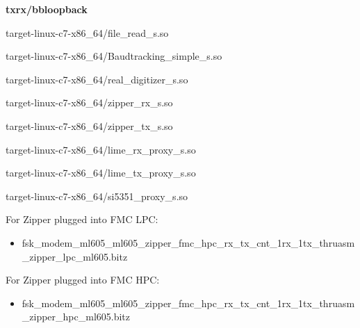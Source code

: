	\noindent\textbf{txrx/bbloopback}
	\begin{itemize}
	\begin{minipage}[t]{.5\textwidth}
	\item target-linux-c7-x86\_64/file\_read\_s.so
	\item target-linux-c7-x86\_64/Baudtracking\_simple\_s.so
	\item target-linux-c7-x86\_64/real\_digitizer\_s.so
	\item target-linux-c7-x86\_64/zipper\_rx\_s.so
	\end{minipage}
	\begin{minipage}[t]{.5\textwidth}
	\item target-linux-c7-x86\_64/zipper\_tx\_s.so
	\item target-linux-c7-x86\_64/lime\_rx\_proxy\_s.so
	\item target-linux-c7-x86\_64/lime\_tx\_proxy\_s.so
	\item target-linux-c7-x86\_64/si5351\_proxy\_s.so
	\end{minipage}
	\end{itemize}
	For Zipper plugged into FMC LPC:
	\begin{itemize}
		\item fsk\_modem\_ml605\_ml605\_zipper\_fmc\_hpc\_rx\_tx\_cnt\_1rx\_1tx\_thruasm\_zipper\_lpc\_ml605.bitz
	\end{itemize}
	\noindent For Zipper plugged into FMC HPC:
	\begin{itemize}
		\item fsk\_modem\_ml605\_ml605\_zipper\_fmc\_hpc\_rx\_tx\_cnt\_1rx\_1tx\_thruasm\_zipper\_hpc\_ml605.bitz
	\end{itemize}

